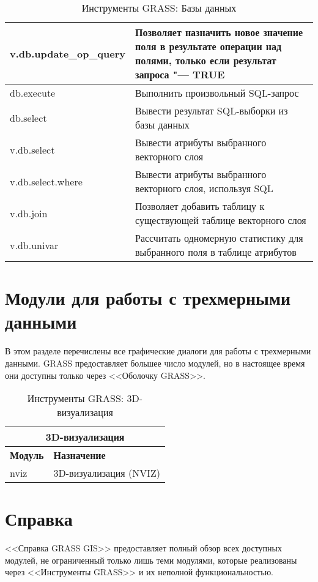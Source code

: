 {\begin{table}[H]
\begin{tabular}{|p{4cm}|p{10cm}|}
  \hline v.db.update\_op\_query & Позволяет назначить новое значение поля в
  результате операции над полями, только если результат запроса "--- TRUE \\
  \hline db.execute & Выполнить произвольный SQL-запрос \\
  \hline db.select & Вывести результат SQL-выборки из базы данных \\
  \hline v.db.select & Вывести атрибуты выбранного векторного слоя \\
  \hline v.db.select.where & Вывести атрибуты выбранного векторного
  слоя, используя SQL \\
  \hline v.db.join & Позволяет добавить таблицу к существующей таблице
  векторного слоя \\
  \hline v.db.univar & Рассчитать одномерную статистику для выбранного
  поля в таблице атрибутов \\
\hline
\end{tabular}
\caption{Инструменты GRASS: Базы данных}
\end{table}}

\clearpage

\section{Модули для работы с трехмерными данными}

В этом разделе перечислены все графические диалоги для работы с
трехмерными данными. GRASS предоставляет большее число модулей, но в
настоящее время они доступны только через <<Оболочку GRASS>>.

{\renewcommand{\arraystretch}{0.7}
\begin{table}[H]
\centering
 \begin{tabular}{|p{4cm}|p{10cm}|}
  \hline \multicolumn{2}{|c|}{\textbf{3D-визуализация}} \\
  \hline \textbf{Модуль} & \textbf{Назначение} \\
  \hline nviz & 3D-визуализация (NVIZ) \\
\hline
\end{tabular}
\caption{Инструменты GRASS: 3D-визуализация}
\end{table}}

\section{Справка}

<<Справка GRASS GIS>> предоставляет полный обзор всех доступных модулей,
не ограниченный только лишь теми модулями, которые реализованы через
<<Инструменты GRASS>> и их неполной функциональностью.

